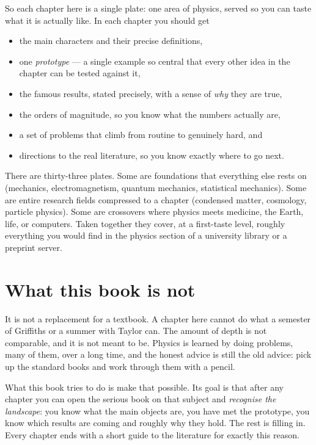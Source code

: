 So each chapter here is a single plate: one area of physics, served so you can taste what it is actually like. In each chapter you should get
\begin{itemize}[itemsep=2pt]
  \item the main characters and their precise definitions,
  \item one \emph{prototype} --- a single example so central that every other idea in the chapter can be tested against it,
  \item the famous results, stated precisely, with a sense of \emph{why} they are true,
  \item the orders of magnitude, so you know what the numbers actually are,
  \item a set of problems that climb from routine to genuinely hard, and
  \item directions to the real literature, so you know exactly where to go next.
\end{itemize}

There are thirty-three plates. Some are foundations that everything else rests on (mechanics, electromagnetism, quantum mechanics, statistical mechanics). Some are entire research fields compressed to a chapter (condensed matter, cosmology, particle physics). Some are crossovers where physics meets medicine, the Earth, life, or computers. Taken together they cover, at a first-taste level, roughly everything you would find in the physics section of a university library or a preprint server.

\section*{What this book is not}

It is not a replacement for a textbook. A chapter here cannot do what a semester of Griffiths or a summer with Taylor can. The amount of depth is not comparable, and it is not meant to be. Physics is learned by doing problems, many of them, over a long time, and the honest advice is still the old advice: pick up the standard books and work through them with a pencil.

What this book tries to do is make that possible. Its goal is that after any chapter you can open the serious book on that subject and \emph{recognise the landscape}: you know what the main objects are, you have met the prototype, you know which results are coming and roughly why they hold. The rest is filling in. Every chapter ends with a short guide to the literature for exactly this reason.

